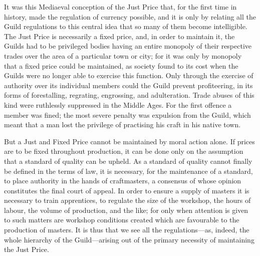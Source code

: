 \documentclass{book}
\begin{document}
It was this Mediaeval conception of the Just Price that, for the first time in history, made the regulation of currency possible, and it is only by relating all the Guild regulations to this central idea that so many of them become intelligible. The Just Price is necessarily a fixed price, and, in order to maintain it, the Guilds had to be privileged bodies having an entire monopoly of their respective trades over the area of a particular town or city; for it was only by monopoly that a fixed price could be maintained, as society found to its cost when the Guilds were no longer able to exercise this function. Only through the exercise of authority over its individual members could the Guild prevent profiteering, in its forms of forestalling, regrating, engrossing, and adulteration. Trade abuses of this kind were ruthlessly suppressed in the Middle Ages. For the first offence a member was fined; the most severe penalty was expulsion from the Guild, which meant that a man lost the privilege of practising his craft in his native town.

But a Just and Fixed Price cannot be maintained by moral action alone. If prices are to be fixed throughout production, it can be done only on the assumption that a standard of quality can be upheld. As a standard of quality cannot finally be defined in the terms of law, it is necessary, for the maintenance of a standard, to place authority in the hands of craftmasters, a consensus of whose opinion constitutes the final court of appeal. In order to ensure a supply of masters it is necessary to train apprentices, to regulate the size of the workshop, the hours of labour, the volume of production, and the like; for only when attention is given to such matters are workshop conditions created which are favourable to the production of masters. It is thus that we see all the regulations—as, indeed, the whole hierarchy of the Guild—arising out of the primary necessity of maintaining the Just Price.\footnotemark[4]
\end{document}

